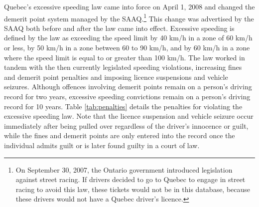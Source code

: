Quebec’s excessive speeding law came into force on April 1, 2008 
and changed the demerit point system managed by the SAAQ.\footnote{%
%
On September 30, 2007, the Ontario government introduced legislation against street racing. 
If drivers decided to go to Quebec to engage in street racing to avoid this law, 
these tickets would not be in this database, 
because these drivers would not have a Quebec driver's licence.} 
% 
This change was advertised by the SAAQ both before and after the law came into effect. 
Excessive speeding is defined by the law as exceeding the speed limit 
by 40 km/h in a zone of 60 km/h or less, 
by 50 km/h in a zone between 60 to 90 km/h, 
and by 60 km/h in a zone where the speed limit is equal to or greater than 100 km/h. 
The law worked in tandem with the then currently legislated speeding violations, 
increasing fines and demerit point penalties 
and imposing licence suspensions and vehicle seizures. 
Although offences involving demerit points remain on a person’s driving record for two years,
excessive speeding convictions remain on a person’s driving record for 10 years. 
% 
Table \ref{tab:penalties} details the penalties for violating the excessive speeding law. 
Note that the licence suspension and vehicle seizure occur 
immediately after being pulled over regardless of the driver’s innocence or guilt, 
while the fines and demerit points are only entered into the record 
once the individual admits guilt or is later found guilty in a court of law. 




